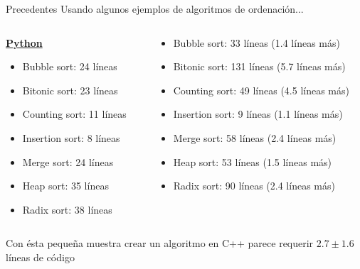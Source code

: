 \begin{frame}{Precedentes}
Usando algunos ejemplos de algoritmos de ordenación...

\vspace{0.5cm}
\begin{columns}
  \begin{column}{0.5\textwidth}
    \textbf{\underline{Python}}
    \begin{itemize}
        \item Bubble sort: 24 líneas
        \item Bitonic sort: 23 líneas
        \item Counting sort: 11 líneas
        \item Insertion sort: 8 líneas
        \item Merge sort: 24 líneas
        \item Heap sort: 35 líneas
        \item Radix sort: 38 líneas
    \end{itemize}
  \end{column}

  \begin{column}{0.5\textwidth}
    \textbf{\underline{\CC}}
    \begin{itemize}
        \item Bubble sort: 33 líneas (1.4 líneas más)
        \item Bitonic sort: 131 líneas (5.7 líneas más)
        \item Counting sort: 49 líneas (4.5 líneas más)
        \item Insertion sort: 9 líneas (1.1 líneas más)
        \item Merge sort: 58 líneas (2.4 líneas más)
        \item Heap sort: 53 líneas (1.5 líneas más)
        \item Radix sort: 90 líneas (2.4 líneas más)
    \end{itemize}
  \end{column}
\end{columns}

\vspace{0.5cm}
Con ésta pequeña muestra crear un algoritmo en C++ parece requerir
$2.7 \pm 1.6$ líneas de código

\end{frame}

